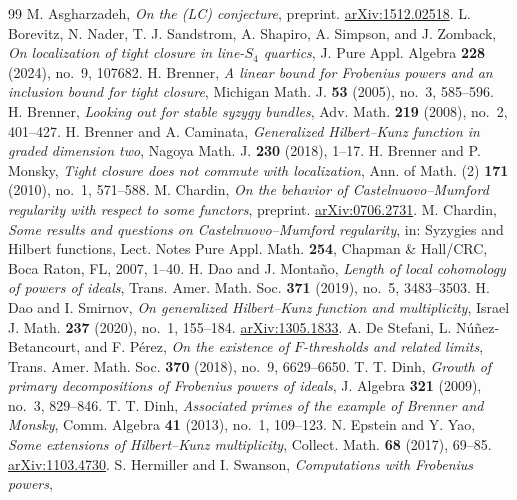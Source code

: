 \documentclass[11pt,a4paper,reqno]{amsart}
\numberwithin{equation}{section}
\theoremstyle{plain}
\theoremstyle{definition}
\theoremstyle{remark}
\begin{document}
\begin{thebibliography}{99}
M. Asgharzadeh, \emph{On the (LC) conjecture}, preprint.
\href{https://arxiv.org/abs/1512.02518}{arXiv:1512.02518}.
L. Borevitz, N. Nader, T. J. Sandstrom, A. Shapiro, A. Simpson, and
J. Zomback, \emph{On localization of tight closure in line-$S_4$
quartics}, J. Pure Appl. Algebra \textbf{228} (2024), no.~9, 107682.
H. Brenner, \emph{A linear bound for Frobenius powers and an inclusion
bound for tight closure}, Michigan Math. J. \textbf{53} (2005), no.~3,
585--596.
H. Brenner, \emph{Looking out for stable syzygy bundles}, Adv. Math.
\textbf{219} (2008), no.~2, 401--427.
H. Brenner and A. Caminata, \emph{Generalized Hilbert--Kunz function
in graded dimension two}, Nagoya Math. J. \textbf{230} (2018), 1--17.
H. Brenner and P. Monsky, \emph{Tight closure does not commute with
localization}, Ann. of Math. (2) \textbf{171} (2010), no.~1, 571--588.
M. Chardin, \emph{On the behavior of Castelnuovo--Mumford regularity
with respect to some functors}, preprint.
\href{https://arxiv.org/abs/0706.2731}{arXiv:0706.2731}.
M. Chardin, \emph{Some results and questions on Castelnuovo--Mumford
regularity}, in: Syzygies and Hilbert functions, Lect. Notes Pure
Appl. Math. \textbf{254}, Chapman \& Hall/CRC, Boca Raton, FL, 2007,
1--40.
H. Dao and J. Monta\~no, \emph{Length of local cohomology of powers
of ideals}, Trans. Amer. Math. Soc. \textbf{371} (2019), no.~5,
3483--3503.
H. Dao and I. Smirnov, \emph{On generalized Hilbert--Kunz function
and multiplicity}, Israel J. Math. \textbf{237} (2020), no.~1,
155--184. \href{https://arxiv.org/abs/1305.1833}{arXiv:1305.1833}.
A. De Stefani, L. N\'u\~nez-Betancourt, and F. P\'erez,
\emph{On the existence of $F$-thresholds and related limits},
Trans. Amer. Math. Soc. \textbf{370} (2018), no.~9, 6629--6650.
T. T. Dinh, \emph{Growth of primary decompositions of Frobenius powers
of ideals}, J. Algebra \textbf{321} (2009), no.~3, 829--846.
T. T. Dinh, \emph{Associated primes of the example of Brenner and
Monsky}, Comm. Algebra \textbf{41} (2013), no.~1, 109--123.
N. Epstein and Y. Yao, \emph{Some extensions of Hilbert--Kunz
multiplicity}, Collect. Math. \textbf{68} (2017), 69--85.
\href{https://arxiv.org/abs/1103.4730}{arXiv:1103.4730}.
S. Hermiller and I. Swanson, \emph{Computations with Frobenius powers},

\end{thebibliography}
\end{document}
